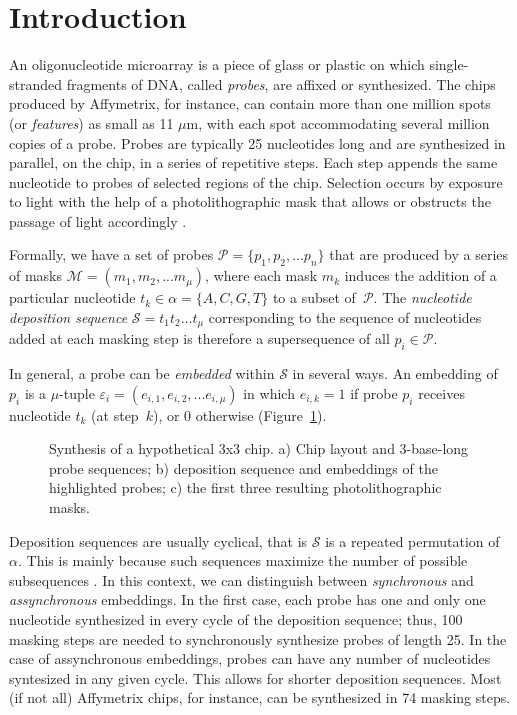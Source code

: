 \documentclass{bioinfo}
\begin{document}
\section{Introduction}

An oligonucleotide microarray is a piece of glass or plastic on which single-stranded fragments of DNA, called \emph{probes}, are affixed or synthesized. The chips produced by Affymetrix, for instance, can contain more than one million spots (or \emph{features}) as small as 11 $\mu$m, with each spot accommodating several million copies of a probe. Probes are typically 25 nucleotides long and are synthesized in parallel, on the chip, in a series of repetitive steps. Each step appends the same nucleotide to probes of selected regions of the chip. Selection occurs by exposure to light with the help of a photolithographic mask that allows or obstructs the passage of light accordingly \citep{FODOR91}.

Formally, we have a set of probes $\mathcal{P} = \{p_{1}, p_{2}, ... p_{n}\}$ that are produced by a series of masks $\mathcal{M} = (m_{1}, m_{2}, ... m_{\mu})$, where each mask $m_{k}$ induces the addition of a particular nucleotide $t_{k} \in \alpha = \{A, C, G, T\}$ to a subset of~$\mathcal{P}$. The \emph{nucleotide deposition sequence} $\mathcal{S} = t_{1} t_{2} \ldots t_{\mu}$ corresponding to the sequence of nucleotides added at each masking step is therefore a supersequence of all $p_{i} \in \mathcal{P}$.

In general, a probe can be \emph{embedded} within $\mathcal{S}$ in several ways. An embedding of $p_{i}$ is a $\mu$-tuple $\varepsilon_{i} = (e_{i,1}, e_{i,2}, ... e_{i,\mu})$ in which $e_{i,k} = 1$ if probe $p_{i}$ receives nucleotide $t_{k}$ (at step~$k$), or 0 otherwise (Figure~\ref{fig:masking_process}).

\begin{figure}
\caption{Synthesis of a hypothetical 3x3 chip. a) Chip layout and 3-base-long probe sequences; b) deposition sequence and embeddings of the highlighted probes; c) the first three resulting photolithographic masks.}
\label{fig:masking_process}
\end{figure}

Deposition sequences are usually cyclical, that is $\mathcal{S}$ is a repeated permutation of $\alpha$. This is mainly because such sequences maximize the number of possible subsequences \citep{CHASE76}. In this context, we can distinguish between \emph{synchronous} and \emph{assynchronous} embeddings. In the first case, each probe has one and only one nucleotide synthesized in every cycle of the deposition sequence; thus, 100 masking steps are needed to synchronously synthesize probes of length 25. In the case of assynchronous embeddings, probes can have any number of nucleotides syntesized in any given cycle. This allows for shorter deposition sequences. Most (if not all) Affymetrix chips, for instance, can be synthesized in 74 masking steps.
\end{document}
